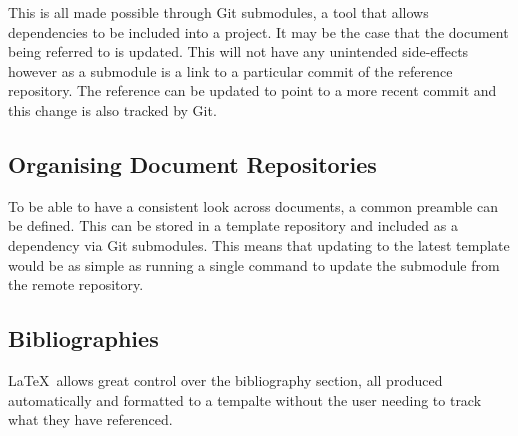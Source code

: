 \printbibliography[keyword={Internal}, heading=none]

This is all made possible through Git submodules, a tool that allows dependencies to be included into a project. It may be the case that the document being referred to is updated. This will not have any unintended side-effects however as a submodule is a link to a particular commit of the reference repository. The reference can be updated to point to a more recent commit and this change is also tracked by Git.

\subsection{Organising Document Repositories}
\label{subsec:OrganisingDocumentRepositories}

To be able to have a consistent look across documents, a common preamble can be defined. This can be stored in a template repository and included as a dependency via Git submodules. This means that updating to the latest template would be as simple as running a single command to update the submodule from the remote repository.

\subsection{Bibliographies}
\label{subsec:Bibliographies}

\LaTeX\ allows great control over the bibliography section, all produced automatically and formatted to a tempalte without the user needing to track what they have referenced.